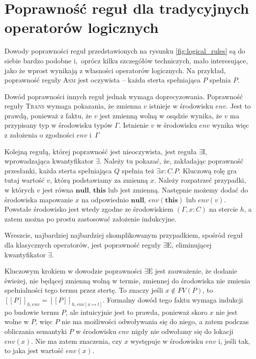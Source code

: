 \documentclass[]{pracamgr}
\renewcommand \| {\hspace{0.75em} | \hspace{0.75em} }
\renewcommand \[ {[\![}
\renewcommand \] {]\!]}
\theoremstyle{definition}
\newcommand{\jnull}{\mathbf{null}\xspace}
\newcommand{\jthis}{\textbf{this}\xspace}
\begin{document}
\section{Poprawność reguł dla tradycyjnych operatorów logicznych}
Dowody poprawności reguł przedstawionych na rysunku \ref{fig:logical_rules} są do siebie
bardzo podobne i,~oprócz kilku szczegółów techniczych, mało interesujące, jako że wprost
wynikają z własności operatorów logicznych.
Na przykład, poprawność reguły \textsc{Asm} jest oczywista -- każda sterta spełniająca $P$ spełnia $P$.

Dowód poprawności innych reguł jednak wymaga doprecyzowania.
Poprawność reguły \textsc{Trans} wymaga pokazania, że zmienna $v$ istnieje w środowisku $\mathit{env}$.
Jest to prawdą, ponieważ z faktu, że $v$ jest zmienną wolną w osądzie wynika, że $v$ ma przypisany
typ w środowisku typów $\Gamma$.
Istnienie $v$ w środowisku $\mathit{env}$ wynika więc z założenia o zgodności $\mathit{env}$ i~$\Gamma$ 

Kolejną regułą, której poprawność jest nieoczywista, jest reguła $\exists \mathrm{I}$,
wprowadzająca kwantyfikator $\exists$.
Należy tu pokazać, że, zakładając poprawność przesłanki, każda sterta spełniająca
$Q$ spełnia też $\exists x : C . P$.
Kluczową rolę gra tutaj wartość $v$, którą podstawiamy za zmienną $x$.
Należy rozpatrzeć przypadki, w których $v$ jest równa $\jnull$, $\jthis$ lub jest zmienną.
Następnie możemy dodać do środowiska mapowanie $x$ na odpowiednio $\jnull$, $env(\jthis)$ lub $env(v)$.
Powstałe środowisko jest wtedy zgodne ze środowiskiem $(\Gamma, x : C)$ na stercie $h$,
a zatem można po prostu zastosować założenie indukcyjne.

Wreszcie, najbardziej najbardziej skomplikowanym przypadkiem, spośród reguł dla klasycznych operatorów,
jest poprawność reguły $\exists\mathrm{E}$, eliminującej kwantyfikator $\exists$.

Kluczowym krokiem w dowodzie poprawności $\exists\mathrm{E}$ jest zauważenie, że dodanie świeżej,
nie będącej zmienną wolną w termie,
zmiennej do środowiska nie zmienia spełnialności tego termu przez stertę.
To znaczy jeśli $x \not\in FV(P)$, to $\[ P \]_{h, env} = \[ P \]_{h, env[x \mapsto l]}$.
Formalny dowód tego faktu wymaga indukcji po budowie termu $P$, ale intuicyjnie jest to prawda,
ponieważ skoro $x$ nie jest wolne w $P$, więc $P$ nie ma możliwości odwoływania się do niego,
a zatem podczas obliczania semantyki $P$ w środowisku $\mathit{env}$ nigdy nie odwołamy się
do lokacji $env(x)$. Nie ma zatem znaczenia, czy $x$ występuje w środowisku $\mathit{env}$ i,
jeśli tak, to jaka jest wartość $env(x)$.
\end{document}
